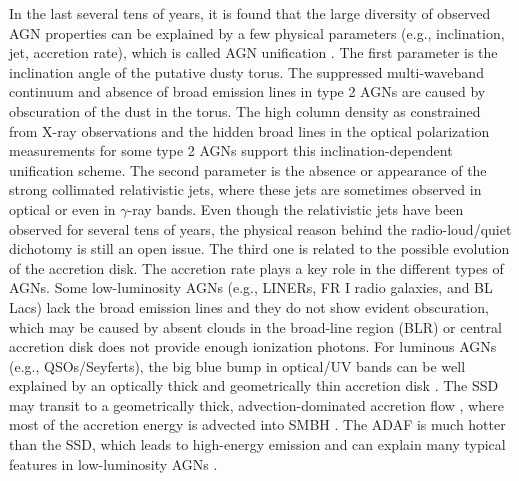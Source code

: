 \documentclass[linenumbers]{aastex631}
\begin{document}
In the last several tens of years, it is found that the large diversity of observed AGN properties can be explained by a few physical parameters (e.g., inclination, jet, accretion rate), which is called AGN unification \citep[e.g.,][and references therein]{1993ARA&A..31..473A,2015ARA&A..53..365N}. The first parameter is the inclination angle of the putative dusty torus. The suppressed multi-waveband continuum and absence of broad emission lines in type 2 AGNs are caused by obscuration of the dust in the torus. The high column density as constrained from X-ray observations and the hidden broad lines in the optical polarization measurements for some type 2 AGNs support this inclination-dependent unification scheme. The second parameter is the absence or appearance of the strong collimated relativistic jets, where these jets are sometimes observed in optical or even in $\gamma$-ray bands. Even though the relativistic jets have been observed for several tens of years, the physical reason behind the radio-loud/quiet dichotomy is still an open issue. The third one is related to the possible evolution {\color{red}of the accretion disk}. The accretion rate plays a key role in the different types of AGNs. Some low-luminosity AGNs (e.g., LINERs, FR I radio galaxies, and BL Lacs) lack the broad emission lines and they do not show evident obscuration, which may be caused by absent clouds in the broad-line region (BLR) or central accretion disk does not provide enough ionization photons. For luminous AGNs (e.g., QSOs/Seyferts), the big blue bump in optical/UV bands can be well explained by an optically thick and geometrically thin accretion disk \citep[SSD;][]{1973A&A....24..337S}. The SSD may transit to a geometrically thick, advection-dominated accretion flow \citep[ADAF; e.g.,][and references therein]{2014ARA&A..52..529Y}, where most of the accretion energy is advected into SMBH . The ADAF is much hotter than the SSD, which leads to high-energy emission and can explain many typical features in low-luminosity AGNs \citep[e.g.,][]{2008ARA&A..46..475H}.  
     




\end{document}
